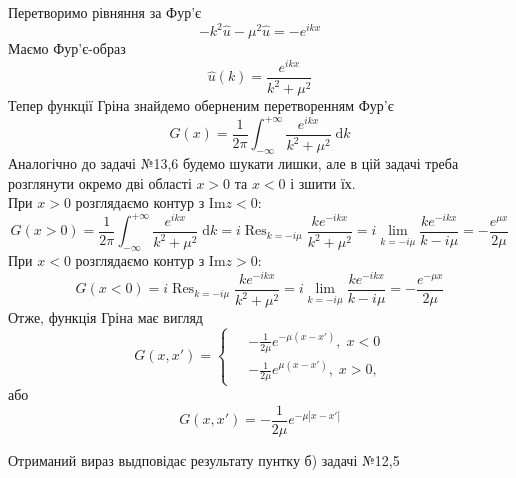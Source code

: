 Перетворимо рівняння за Фур'є 
\begin{equation*}
    - k^2 \hat{u} - \mu^2 \hat{u} = -e^{ikx}
\end{equation*}
Маємо Фур'є-образ
\begin{equation}
    \hat{u}(k) = \frac{e^{ikx}}{k^2 + \mu^2} 
\end{equation} 
Тепер функції Гріна знайдемо оберненим перетворенням Фур'є
\begin{equation}
    G(x) = \frac{1}{2\pi} \int_{-\infty}^{+\infty} \frac{e^{ikx}}{k^2 + \mu^2} \;\mathrm{d}k 
\end{equation}  
Аналогічно до задачі №13,6 будемо шукати лишки, але в цій задачі треба розглянути окремо дві області $x > 0$ та $x < 0$ і зшити їх.\\
При $x > 0$ розглядаємо контур з $\mathrm{Im}z < 0$:
\begin{equation*}
    G(x>0) = \frac{1}{2\pi} \int_{-\infty}^{+\infty} \frac{e^{ikx}}{k^2 + \mu^2} \;\mathrm{d}k = i \mathop{\mathrm{Res}}_{k = -i\mu} \frac{ke^{-ikx}}{k^2 + \mu^2} = i \lim_{k = -i\mu} \frac{ke^{-ikx}}{k - i\mu} = -\frac{e^{\mu x}}{2\mu}
\end{equation*}
При $x < 0$ розглядаємо контур з $\mathrm{Im}z > 0$:
\begin{equation*}
    G(x<0) = i \mathop{\mathrm{Res}}_{k = -i\mu} \frac{ke^{-ikx}}{k^2 + \mu^2} = i \lim_{k = -i\mu} \frac{ke^{-ikx}}{k - i\mu} = -\frac{e^{-\mu x}}{2\mu}
\end{equation*}
Отже, функція Гріна має вигляд
\begin{equation}
    G(x, x') = 
    \left\{ \begin{aligned}
        \;& -\frac{1}{2\mu} e^{-\mu (x - x')} , \; x < 0 \\
          & -\frac{1}{2\mu} e^{\mu (x - x')} , \; x > 0,
    \end{aligned} \right.
\end{equation}
або 
\begin{equation}
    G(x,x') = -\frac{1}{2\mu} e^{-\mu |x - x'|}
\end{equation}

Отриманий вираз выдповідає результату пунтку б) задачі №12,5 

%